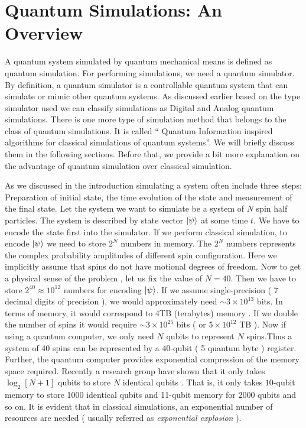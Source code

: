 \documentclass[12pt,a4paper]{report}
\begin{document}
\chapter{Quantum Simulations: An Overview}

A quantum system simulated by quantum mechanical means is defined as quantum simulation. For performing simulations, we need a quantum simulator.  By definition, a quantum simulator is a controllable quantum system that can simulate or mimic other quantum systems. As discussed earlier based on the type simulator used we can classify simulations as Digital and Analog quantum simulations. There is one more type of simulation method that belongs to the class of quantum simulations. It is called “ Quantum Information inspired algorithms for classical simulations of quantum systems”. We will briefly discuss them in the following sections. Before that, we provide a bit more explanation on the advantage of quantum simulation over classical simulation.

As we discussed in the introduction simulating a system often include three steps: Preparation of initial state, the time evolution of the state and measurement of the final state. Let the system we want to simulate be a system of $N$ spin half particles. The system is described by state vector $\ket{\psi}$ at some time $t$. We have to encode the state first into the simulator.  If we perform classical simulation, to encode $\ket{\psi}$ we need to store $2^{N}$ numbers in memory. The $2^{N}$ numbers represents the complex probability amplitudes of different spin configuration. Here we implicitly assume that spins do not have motional degrees of freedom. Now to get a physical sense of the problem , let us fix the value of $N = 40$. Then we have to store $2^{40} \approx 10^{12}$ numbers for encoding $\ket{\psi}$. If we assume single-precision ( 7 decimal digits of precision ), we would approximately need $\sim 3 \times 10^{13}$ bits. In terms of memory, it would correspond to 4TB (terabytes) memory \cite{lloyd}\cite{georgescu}. If we double the number of spins it would require $\sim 3 \times 10^{25}$ bits ( or $5 \times 10^{12}$ TB ). Now if using a quantum computer, we only need $N$ qubits to represent $N$ spins.Thus a system of $40$ spins can be represented by a $40$-qubit ( 5 quantum byte ) register. Further, the quantum computer provides exponential compression of the memory space required. Recently a research group have shown that it only takes $\log_{2} [N+1]$ qubits to store $N$ identical qubits \cite{rozema}. That is, it only takes $10$-qubit memory to store 1000 identical qubits and 11-qubit memory for 2000 qubits and so on. It is evident that in classical simulations, an exponential number of resources are needed ( usually referred as \emph{exponential explosion} ).
\end{document}
